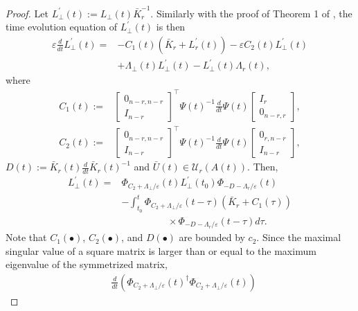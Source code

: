 \documentclass[fleqn,10pt]{SICE_FES26}
\begin{document}
\begin{proof}
	
	Let $L_{\perp}^{\prime}(t) := L_{\perp} (t) \bar{K}_{r}^{-1}$.  
	Similarly with the proof of Theorem 1 of \cite{TsuzukiOhki2024}, the time evolution equation of $L_{\perp}^{\prime} (t) $ is then 
	\begin{align*}
	\varepsilon \frac{d}{dt} L_{\perp}^{\prime} (t) =& 
	-C_{1}(t) ( \bar{K}_{r} +  L_{r}^{\prime}(t))
	-
	\varepsilon C_{2} (t) L_{\perp}^{\prime}(t)
	\\ & 
	+
	\Lambda _{\perp} (t) L_{\perp}^{\prime} (t) 
	-
	 L_{\perp}^{\prime} (t) \Lambda _{r}(t) , 
	\end{align*}
	where 
	\begin{align*}
	C_{1}(t)  :=& \begin{bmatrix} 0_{n-r,n-r} \\ I_{n-r} \end{bmatrix} ^{\top} 
	 \Psi (t) ^{-1} \frac{d}{dt}\Psi (t)\begin{bmatrix} I_{r} \\ 0_{n-r,r} \end{bmatrix}, 
	 \\
	 C_{2}(t)  := &\begin{bmatrix} 0_{n-r,n-r} \\ I_{n-r} \end{bmatrix} ^{\top}
	 \Psi (t) ^{-1} \frac{d}{dt}\Psi (t)
	 \begin{bmatrix} 0_{r,n-r} \\ I_{n-r} \end{bmatrix}, 
	 \end{align*}
	 $D(t) := \bar{K}_{r}(t) \frac{d}{dt}\bar{K}_{r}(t)^{-1} $ and 
	$\bar{U}(t) \in {\mathcal{U}}_{r}(A(t))$. 
	Then, 
	\begin{align*}
	L_{\perp}^{\prime} (t) = & 
	\Phi _{C_{2} + \Lambda _{\perp}/ \varepsilon }(t) L_{\perp}^{\prime}(t_{0}) \Phi _{-D -\Lambda _{r} /\varepsilon }(t) 
	\\ & 
	- 
	\int _{t_{0}}^{t} \Phi _{C_{2} + \Lambda _{\perp}/ \varepsilon }(t-\tau) 
	(\bar{K}_{r} + C_{1}(\tau )) 
	\\ & \hspace{2cm}
	\times \Phi _{-D -\Lambda _{r} /\varepsilon }(t-\tau )  d\tau . 
	\end{align*}
	Note that $C_{1}(\bullet )$, $C_{2}(\bullet )$, and $D(\bullet )$ are bounded by $c_{2}$. 
	Since the maximal singular value of a square matrix is larger than or equal to the maximum eigenvalue of the symmetrized matrix, 
	\begin{align*}
	&\frac{d}{dt}  ( \Phi _{C_{2} + \Lambda _{\perp}/ \varepsilon }(t) ^{\dagger} \Phi _{C_{2} + \Lambda _{\perp}/ \varepsilon }(t) )

\end{align*}
\end{proof}
\end{document}
